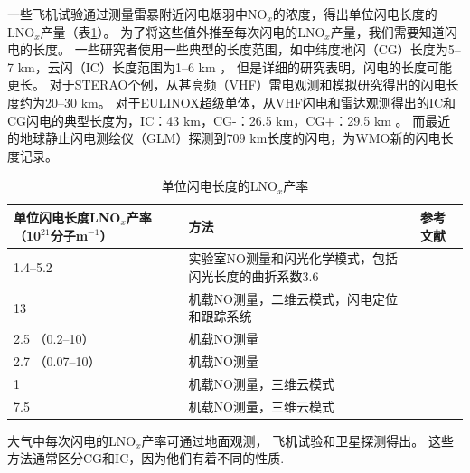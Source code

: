 一些飞机试验通过测量雷暴附近闪电烟羽中NO$_x$的浓度，得出单位闪电长度的LNO$_x$产量（表\ref{table:LNOx/length}）。
为了将这些值外推至每次闪电的LNO$_x$产量，我们需要知道闪电的长度。
一些研究者使用一些典型的长度范围，如中纬度地闪（CG）长度为5--7 km，云闪（IC）长度范围为1--6 km \citep{Price.1997b}，
但是详细的研究表明，闪电的长度可能更长\citep{Defer.2001,Thery.2001,Peterson.2020b}。
对于STERAO个例，从甚高频（VHF）雷电观测和模拟研究得出的闪电长度约为20--30 km\citep{Defer.2001}。
对于EULINOX超级单体，从VHF闪电和雷达观测得出的IC和CG闪电的典型长度为，IC：43 km，CG-：26.5 km，CG+：29.5 km \citep{Dotzek.2000}。
而最近的地球静止闪电测绘仪（GLM）探测到709 km长度的闪电，为WMO新的闪电长度记录\citep{Peterson.2020b}。

\clearpage %
{
\centering
\footnotesize
\begin{longtable}
{|p{15em}|p{13em}|p{10em}|}
\caption{单位闪电长度的LNO$_x$产率}
\label{table:LNOx/length} \\
\hline
单位闪电长度LNO$_x$产率（10$^{21}$分子m$^{-1}$）   & 方法                          & 参考文献 \\ \hline
1.4--5.2                                     & 实验室NO测量和闪光化学模式，包括闪光长度的曲折系数3.6   & \citet{Wang.1998} \\ \hline
13                                           & 机载NO测量，二维云模式，闪电定位和跟踪系统  & \citet{Holler.1999} \\ \hline
2.5 （0.2--10）                                & 机载NO测量                     & \citet{Stith.1999} \\ \hline
2.7 （0.07--10）                               & 机载NO测量                     & \citet{Huntrieser.2002} \\ \hline
1                                            & 机载NO测量，三维云模式           & \citet{Skamarock.2003} \\ \hline
7.5                                          & 机载NO测量，三维云模式           & \citet{Ott.2007} \\ \hline
\end{longtable}\par
}


大气中每次闪电的LNO$_x$产率可通过地面观测\citep{Noxon.1976}，
飞机试验\citep{Chameides.1987}和卫星探测\citep{Beirle.2004}得出。
这些方法通常区分CG和IC，因为他们有着不同的性质.


